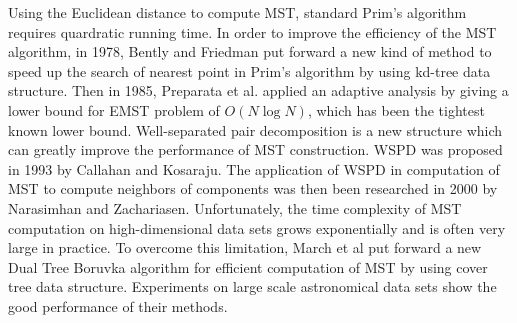 		Using the Euclidean distance to compute MST, standard Prim's algorithm requires quardratic running time. In order to improve the efficiency of the MST algorithm, in 1978, Bently and Friedman put forward a new kind of method to speed up the search of nearest point in Prim's algorithm by using kd-tree data structure\cite{Bentley1975Fast}. Then in 1985, Preparata et al. applied an adaptive analysis by giving a lower bound for EMST problem of $O(N\log N)$, which has been the tightest known lower bound\cite{Preparata1985Computational}. Well-separated pair decomposition is a new structure which can greatly improve the performance of MST construction. WSPD was proposed in 1993 by Callahan and Kosaraju\cite{Callahan93fasteralgorithms}. The application of WSPD in computation of MST to compute neighbors of components was then been researched in 2000 by Narasimhan and Zachariasen\cite{Narasimhan00experimentswith}. Unfortunately, the time complexity of MST computation on high-dimensional data sets grows exponentially and is often very large in practice. To overcome this limitation, March et al put forward a new Dual Tree Boruvka algorithm for efficient computation of MST by using cover tree data structure\cite{March2010Fast}. Experiments on large scale astronomical data sets show the good performance of their methods.

